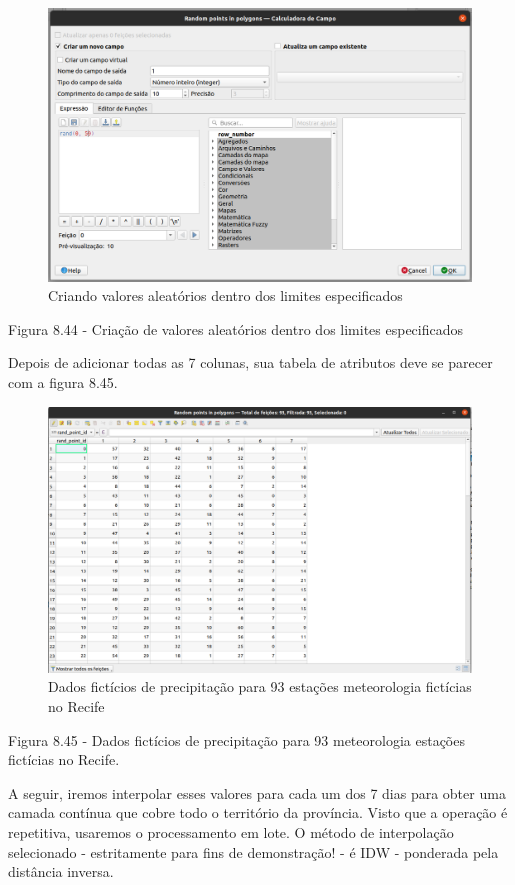 \documentclass[
  portuguese,
]{krantz}
\begin{document}
\begin{figure}
\centering
\includegraphics{media/modulo8/fig844.png}
\caption{Criando valores aleatórios dentro dos limites especificados}
\end{figure}

Figura 8.44 - Criação de valores aleatórios dentro dos limites especificados

Depois de adicionar todas as 7 colunas, sua tabela de atributos deve se parecer com a figura 8.45.

\begin{figure}
\centering
\includegraphics{media/modulo8/fig845.png}
\caption{Dados fictícios de precipitação para 93 estações meteorologia fictícias no Recife}
\end{figure}

Figura 8.45 - Dados fictícios de precipitação para 93 meteorologia estações fictícias no Recife.

A seguir, iremos interpolar esses valores para cada um dos 7 dias para obter uma camada contínua que cobre todo o território da província. Visto que a operação é repetitiva, usaremos o processamento em lote. O método de interpolação selecionado - estritamente para fins de demonstração! - é IDW - ponderada pela distância inversa.
\end{document}
